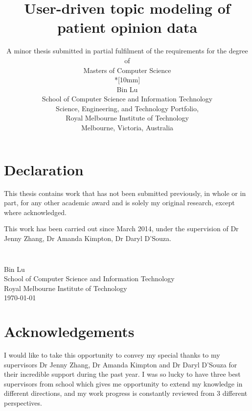 \documentclass[11pt,twoside]{report}
\newcommand{\SubmissionDate}{\today}
\newcommand{\student}{Bin Lu}
\newcommand{\supervisor}{Dr Jenny Zhang, Dr Amanda Kimpton, Dr Daryl D'Souza}
\newcommand{\topic}{User-driven topic modeling of patient opinion data}
\newcommand{\school}{School of Computer Science and Information Technology}
\newcommand{\program}{Masters of Computer Science}
\newcommand{\institution}{Royal Melbourne Institute of Technology}
\begin{document}
\title{{\Large\bf \topic}}
\author{
A minor thesis submitted in partial fulfilment of the requirements for the degree of
\\\program\\*[10mm]
\\\student
\\\school
\\Science, Engineering, and Technology Portfolio,
\\\institution
\\Melbourne, Victoria, Australia
}
\maketitle
\thispagestyle{empty}


\chapter*{Declaration}

This thesis contains work that has not been submitted previously, in
whole or in part, for any other academic award and is solely my
original research, except where acknowledged.

This work has been carried out since March 2014, under the
supervision of {\supervisor}.

\paragraph{}
\vspace{5cm}\noindent \\\student \\
\school\\
\institution\\
\SubmissionDate


\chapter*{Acknowledgements}

I would like to take this opportunity to convey my special thanks to my supervisors Dr Jenny Zhang, Dr Amanda Kimpton and Dr Daryl D'Souza for their incredible support during the past year. I was so lucky to have three best supervisors from school which gives me opportunity to extend my knowledge in different directions, and my work progress is constantly reviewed from 3 different perspectives. 
\end{document}
